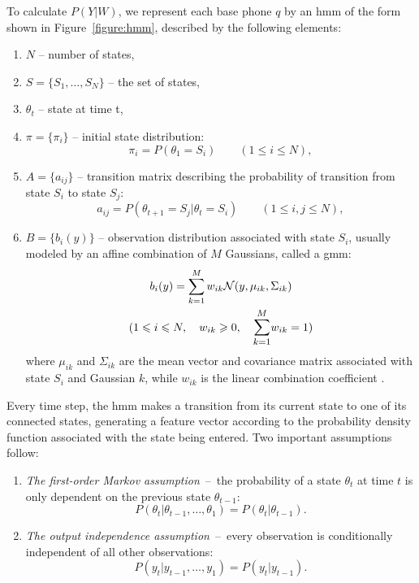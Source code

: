 To calculate $P(Y|W)$, we represent each base phone $q$ by an \gls{hmm} of the form shown in Figure~\ref{figure:hmm}, described by the following elements:
\begin{enumerate}
\item $N$ -- number of states,
\item $S=\{S_{1}, \ldots, S_{N}\}$ -- the set of states,
\item $\theta_{t}$ -- state at time t,
\item $\pi=\{\pi_{i}\}$ -- initial state distribution:
  \begin{equation*}
    \pi_{i}=P(\theta_{1}=S_{i}) \qquad (1 \leqslant i \leqslant N),
  \end{equation*}
\item $A=\{a_{ij}\}$ -- transition matrix describing the probability of transition from state $S_{i}$ to state $S_{j}$:
  \begin{equation*}
    a_{ij}=P(\theta_{t+1}=S_{j}|\theta_{t}=S_{i}) \qquad (1 \leqslant i, j \leqslant N), 
  \end{equation*}
\item $B=\{b_{i}(y)\}$ -- observation distribution associated with state $S_{i}$, usually modeled by an affine combination of $M$ Gaussians, called a \acrfull{gmm}:
    \begin{gather}
      b_{i}(y)=\sum_{k=1}^{M}w_{ik}\mathcal{N}(y, \mu_{ik}, \Sigma_{ik}) \\
      (1 \leqslant i \leqslant N, \quad w_{ik} \geqslant 0, \quad\mathlarger{\sum_{k=1}^{M}}w_{ik}=1)\nonumber
    \end{gather}
where $\mu_{ik}$ and $\Sigma_{ik}$ are the mean vector and covariance matrix associated with state $S_{i}$ and Gaussian $k$, while $w_{ik}$ is the linear combination coefficient \cite{juang1985mixture}.
\end{enumerate}
Every time step, the \gls{hmm} makes a transition from its current state to one of its connected states, generating a feature vector according to the probability density function associated with the state being entered. Two important assumptions follow:
\begin{enumerate}
	\item \textit{The first-order Markov assumption}~--~the probability of a state $\theta_{t}$ at time $t$ is only dependent on the previous state $\theta_{t-1}$:
  \begin{equation}
    P(\theta_{t}|\theta_{t-1}, \ldots, \theta_{1})=P(\theta_{t}|\theta_{t-1}).
  \end{equation}
\item \textit{The output independence assumption}~--~every observation is conditionally independent of all other observations: 
  \begin{equation}
    P(y_{t}|y_{t-1}, \ldots, y_{1})=P(y_{t}|y_{t-1}).
  \end{equation}
\end{enumerate}
